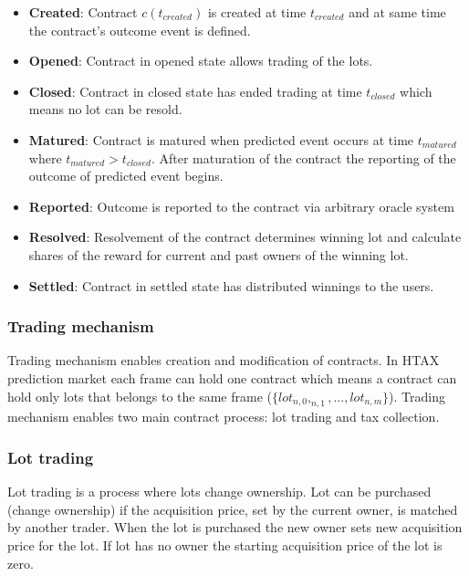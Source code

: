 \documentclass{article}
\begin{document}
	
	\begin{itemize}
		\item \textbf{Created}: Contract $c(t_{created})$  is created at time $t_{created}$ and at same time the contract's outcome event is defined.
		\item \textbf{Opened}: Contract in opened state allows trading of the lots.
		\item \textbf{Closed}: Contract in closed state has ended trading at time $t_{closed}$ which means no lot can be resold.
		\item \textbf{Matured}: Contract is matured when predicted event occurs at time $t_{matured}$ where $t_{matured}>t_{closed}$. After maturation of the contract the reporting of the outcome of predicted event begins.
		\item \textbf{Reported}: Outcome is reported to the contract via arbitrary oracle system
		\item \textbf{Resolved}: Resolvement of the contract determines winning lot and calculate shares of the reward for current and past owners of the winning lot.
		\item \textbf{Settled}: Contract in settled state has distributed winnings to the users.
	\end{itemize}
	
	\subsubsection{Trading mechanism}
	
	Trading mechanism enables creation and modification of contracts. In HTAX prediction market each frame can hold one contract which means a contract can hold only lots that belongs to the same frame ($\{lot_{n,0},_{n,1},...,lot_{n,m}\}$). Trading mechanism enables two main contract process: lot trading and tax collection.
	
	\subsubsection*{Lot trading}
	
	Lot trading is a process where lots change ownership. Lot can be purchased (change ownership) if the acquisition price, set by the current owner, is matched by another trader. When the lot is purchased the new owner sets new acquisition price for the lot. If lot has no owner the starting acquisition price of the lot is zero.  
	
\end{document}
